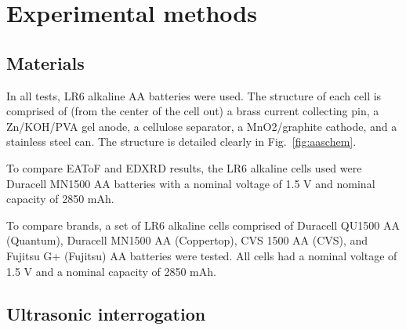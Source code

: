 \section{Experimental methods}
\label{sec:alkbw:exp}

\subsection{Materials}

In all tests, LR6 alkaline AA batteries were used. The structure of each cell is comprised of (from the center of the cell out) a brass current collecting pin, a Zn/KOH/PVA gel anode, a cellulose separator, a MnO2/graphite cathode, and a stainless steel can. The structure is detailed clearly in Fig.~\ref{fig:aaschem}.

To compare EAToF and EDXRD results, the LR6 alkaline cells used were Duracell MN1500 AA batteries with a nominal voltage of 1.5 V and nominal capacity of 2850 mAh.

To compare brands, a set of LR6 alkaline cells comprised of Duracell QU1500 AA (Quantum), Duracell MN1500 AA (Coppertop), CVS 1500 AA (CVS), and Fujitsu G+ (Fujitsu) AA batteries were tested. All cells had a nominal voltage of 1.5 V and a nominal capacity of 2850 mAh.

\subsection{Ultrasonic interrogation}

